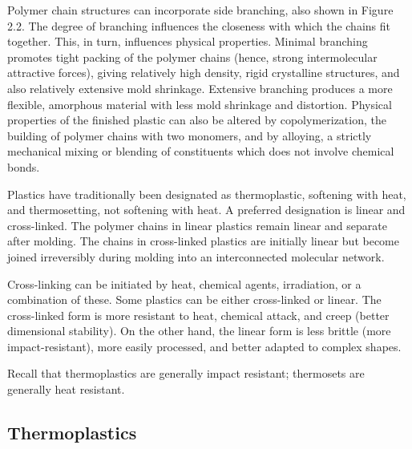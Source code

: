 \documentclass[
10pt,
a4paper,
openany,
svgnames,
]{book}
\begin{document}
Polymer chain structures can incorporate side branching, also shown in Figure 2.2. The degree of branching influences the closeness with which the chains fit together. This, in turn, influences physical properties. Minimal branching promotes tight packing of the polymer chains (hence, strong intermolecular attractive forces), giving relatively high density, rigid crystalline structures, and also relatively extensive mold shrinkage. Extensive branching produces a more flexible, amorphous material with less mold shrinkage and distortion. Physical properties of the finished plastic can also be altered by copolymerization, the building of polymer chains with two monomers, and by alloying, a strictly mechanical mixing or blending of constituents which does not involve chemical bonds. 
 
Plastics have traditionally been designated as thermoplastic, softening with heat, and thermosetting, not softening with heat. A preferred designation is linear and cross-linked. The polymer chains in linear plastics remain linear and separate after molding. The chains in cross-linked plastics are initially linear but become joined irreversibly during molding into an interconnected molecular network.

Cross-linking can be initiated by heat, chemical agents, irradiation, or a combination of these. Some plastics can be either cross-linked or linear. The cross-linked form is more resistant to heat, chemical attack, and creep (better dimensional stability). On the other hand, the linear form is less brittle (more impact-resistant), more easily processed, and better adapted to complex shapes.

Recall that thermoplastics are generally impact resistant; thermosets are generally heat resistant.

\subsection{Thermoplastics}
\end{document}
